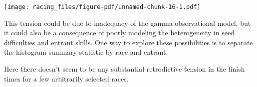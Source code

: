 \documentclass[
  letterpaper,
  DIV=11,
  numbers=noendperiod]{scrartcl}
\newenvironment{Shaded}{\begin{snugshade}}{\end{snugshade}}
\newcommand{\AttributeTok}[1]{\textcolor[rgb]{0.40,0.45,0.13}{#1}}
\newcommand{\DecValTok}[1]{\textcolor[rgb]{0.68,0.00,0.00}{#1}}
\newcommand{\FunctionTok}[1]{\textcolor[rgb]{0.28,0.35,0.67}{#1}}
\newcommand{\NormalTok}[1]{\textcolor[rgb]{0.00,0.23,0.31}{#1}}
\newcommand{\SpecialCharTok}[1]{\textcolor[rgb]{0.37,0.37,0.37}{#1}}
\newcommand{\StringTok}[1]{\textcolor[rgb]{0.13,0.47,0.30}{#1}}
\begin{document}
\begin{Shaded}
\end{Shaded}

\texttt{[image: racing\_files/figure-pdf/unnamed-chunk-16-1.pdf]}

This tension could be due to inadequacy of the gamma observational
model, but it could also be a consequence of poorly modeling the
heterogeneity in seed difficulties and entrant skills. One way to
explore these possibilities is to separate the histogram summary
statistic by race and entrant.

Here there doesn't seem to be any substantial retrodictive tension in
the finish times for a few arbitrarily selected races.
\end{document}
